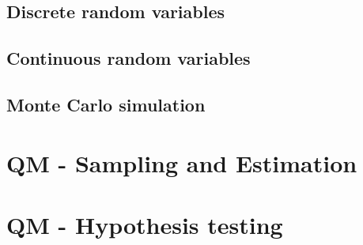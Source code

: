 \subsection{Discrete random variables}

\subsection{Continuous random variables}

\subsection{Monte Carlo simulation}


\section{QM - Sampling and Estimation}


\section{QM - Hypothesis testing}

